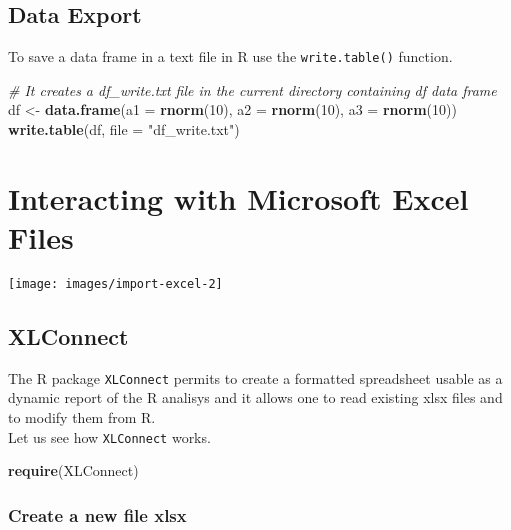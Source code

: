 \documentclass[]{book}
\newenvironment{Shaded}{\begin{snugshade}}{\end{snugshade}}
\newcommand{\KeywordTok}[1]{\textcolor[rgb]{0.13,0.29,0.53}{\textbf{{#1}}}}
\newcommand{\DataTypeTok}[1]{\textcolor[rgb]{0.13,0.29,0.53}{{#1}}}
\newcommand{\DecValTok}[1]{\textcolor[rgb]{0.00,0.00,0.81}{{#1}}}
\newcommand{\StringTok}[1]{\textcolor[rgb]{0.31,0.60,0.02}{{#1}}}
\newcommand{\CommentTok}[1]{\textcolor[rgb]{0.56,0.35,0.01}{\textit{{#1}}}}
\newcommand{\NormalTok}[1]{{#1}}
\begin{document}
\subsection{Data Export}\label{data-export}

To save a data frame in a text file in R use the \texttt{write.table()}
function.

\begin{Shaded}
\begin{Highlighting}[]
\CommentTok{# It creates a df_write.txt file in the current directory containing df data frame}
\NormalTok{df <-}\StringTok{ }\KeywordTok{data.frame}\NormalTok{(}\DataTypeTok{a1 =} \KeywordTok{rnorm}\NormalTok{(}\DecValTok{10}\NormalTok{), }\DataTypeTok{a2 =} \KeywordTok{rnorm}\NormalTok{(}\DecValTok{10}\NormalTok{), }\DataTypeTok{a3 =} \KeywordTok{rnorm}\NormalTok{(}\DecValTok{10}\NormalTok{))}
\KeywordTok{write.table}\NormalTok{(df, }\DataTypeTok{file =} \StringTok{"df_write.txt"}\NormalTok{)}
\end{Highlighting}
\end{Shaded}

\clearpage

\section{Interacting with Microsoft Excel
Files}\label{interacting-with-microsoft-excel-files}

\texttt{[image: images/import-excel-2]}

\subsection{XLConnect}\label{xlconnect}

The R package \texttt{XLConnect} permits to create a formatted
spreadsheet usable as a dynamic report of the R analisys and it allows
one to read existing xlsx files and to modify them from R.\\
Let us see how \texttt{XLConnect} works.

\begin{Shaded}
\begin{Highlighting}[]
\KeywordTok{require}\NormalTok{(XLConnect)}
\end{Highlighting}
\end{Shaded}

\subsubsection{Create a new file xlsx}\label{create-a-new-file-xlsx}
\end{document}
